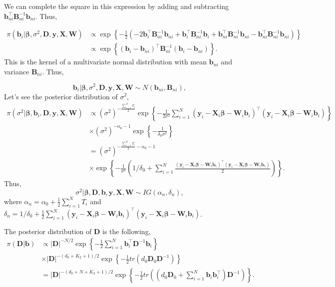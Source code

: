 We can complete the square in this expression by adding and subtracting $\bm{b}_{ni}^{\top}\bm{B}_{ni}^{-1}\bm{b}_{ni}$. Thus,

\begin{align*}
	\pi(\bm{b}_i|\bm{\beta},\sigma^2,\bm{D},\bm{y}, \bm{X}, \bm{W})&\propto \exp\left\{-\frac{1}{2}(-2\bm{b}_i^{\top}\bm{B}_{ni}^{-1}\bm{b}_{ni}+ \bm{b}_i^{\top}\bm{B}_{ni}^{-1}\bm{b}_i+\bm{b}_{ni}^{\top}\bm{B}_{ni}^{-1}\bm{b}_{ni}-\bm{b}_{ni}^{\top}\bm{B}_{ni}^{-1}\bm{b}_{ni})\right\}\\
	&\propto \exp\left\{(\bm{b}_i-\bm{b}_{ni})^{\top}\bm{B}_{ni}^{-1}(\bm{b}_i-\bm{b}_{ni})\right\}. 
\end{align*}
This is the kernel of a multivariate normal distribution with mean $\bm{b}_{ni}$ and variance $\bm{B}_{ni}$. Thus,

\begin{equation*}
	\bm{b}_i|\bm{\beta},\sigma^2,\bm{D},\bm{y}, \bm{X}, \bm{W} \sim {N}(\bm{b}_{ni},\bm{B}_{ni}), 
\end{equation*} 
Let's see the posterior distribution of $\sigma^2$,
\begin{align*}
	\pi(\sigma^2|\bm{\beta},\bm{b}_i,\bm{D},\bm{y}, \bm{X}, \bm{W})&\propto (\sigma^2)^{-\frac{\sum_{i=1}^N T_i}{2}}\exp\left\{-\frac{1}{2\sigma^2}\sum_{i=1}^N(\bm{y}_i-\bm{X}_i\bm{\beta}-\bm{W}_i\bm{b}_i)^{\top}(\bm{y}_i-\bm{X}_i\bm{\beta}-\bm{W}_i\bm{b}_i)\right\}\\
	&\times (\sigma^2)^{-\alpha_0-1}\exp\left\{-\frac{1}{\delta_0\sigma^2}\right\}\\
	&=(\sigma^2)^{-\frac{\sum_{i=1}^N T_i}{2}-\alpha_0-1}\\
	&\times \exp\left\{-\frac{1}{\sigma^2}\left(1/\delta_0+\sum_{i=1}^N\frac{(\bm{y}_i-\bm{X}_i\bm{\beta}-\bm{W}_i\bm{b}_i)^{\top}(\bm{y}_i-\bm{X}_i\bm{\beta}-\bm{W}_i\bm{b}_i)}{2}\right)\right\}. 
\end{align*}
Thus,
\begin{equation*}
	\sigma^2| \bm{\beta}, \bm{D}, \bm{b}, \bm{y}, \bm{X}, \bm{W} \sim {I}{G}(\alpha_n, \delta_n),
\end{equation*}
where $\alpha_n=\alpha_0+\frac{1}{2}\sum_{i=1}^N T_i$ and $\delta_n=1/\delta_0+\frac{1}{2}\sum_{i=1}^N(\bm{y}_i-\bm{X}_i\bm{\beta}-\bm{W}_i\bm{b}_i)^{\top}(\bm{y}_i-\bm{X}_i\bm{\beta}-\bm{W}_i\bm{b}_i)$.

The posterior distribution of $\bm{D}$ is the following,
\begin{align*}
	\pi(\bm{D}|\bm{b})&\propto  |\bm{D}|^{-N/2} \exp\left\{-\frac{1}{2}\sum_{i=1}^N \bm{b}_i^{\top}\bm{D}^{-1}\bm{b}_i\right\}\\
	&\times |\bm{D}|^{-(d_0+K_2+1)/2}\exp\left\{-\frac{1}{2}tr(d_0\bm{D}_0\bm{D}^{-1})\right\}\\
	&=|\bm{D}|^{-(d_0+N+K_2+1)/2}\exp\left\{-\frac{1}{2}tr\left(\left(d_0\bm{D}_0+\sum_{i=1}^N\bm{b}_i\bm{b}_i^{\top}\right)\bm{D}^{-1}\right)\right\}. 
\end{align*}

